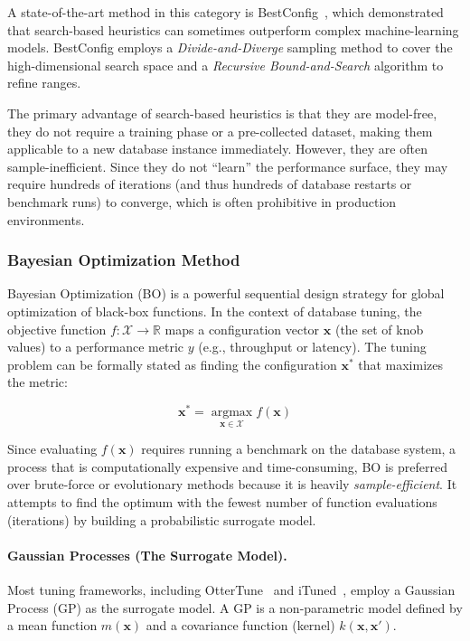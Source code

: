 A state-of-the-art method in this category is BestConfig~\cite{best_config}, which demonstrated that search-based heuristics can sometimes outperform complex machine-learning models.
BestConfig employs a \textit{Divide-and-Diverge} sampling method to cover the high-dimensional search space and a \textit{Recursive Bound-and-Search} algorithm to refine ranges.

The primary advantage of search-based heuristics is that they are model-free, they do not require a training phase or a pre-collected dataset, making them applicable to a new database instance immediately.
However, they are often sample-inefficient.
Since they do not ``learn'' the performance surface, they may require hundreds of iterations (and thus hundreds of database restarts or benchmark runs) to converge, which is often prohibitive in production environments.

\subsubsection{Bayesian Optimization Method}\label{sec:bg-bo}

Bayesian Optimization (BO) is a powerful sequential design strategy for global optimization of black-box functions.
In the context of database tuning, the objective function $f: \mathcal{X} \to \mathbb{R}$ maps a configuration vector $\mathbf{x}$ (the set of knob values) to a performance metric $y$ (e.g., throughput or latency).
The tuning problem can be formally stated as finding the configuration $\mathbf{x}^*$ that maximizes the metric:

\[\mathbf{x}^* = \operatorname*{argmax}_{\mathbf{x} \in \mathcal{X}} f(\mathbf{x})\]

Since evaluating $f(\mathbf{x})$ requires running a benchmark on the database system, a process that is computationally expensive and time-consuming, BO is preferred over brute-force or evolutionary methods because it is heavily \textit{sample-efficient}.
It attempts to find the optimum with the fewest number of function evaluations (iterations) by building a probabilistic surrogate model.

\paragraph{Gaussian Processes (The Surrogate Model).}
Most tuning frameworks, including OtterTune~\cite{ottertune} and iTuned~\cite{ituned}, employ a Gaussian Process (GP) as the surrogate model. A GP is a non-parametric model defined by a mean function $m(\mathbf{x})$ and a covariance function (kernel) $k(\mathbf{x}, \mathbf{x}')$.

